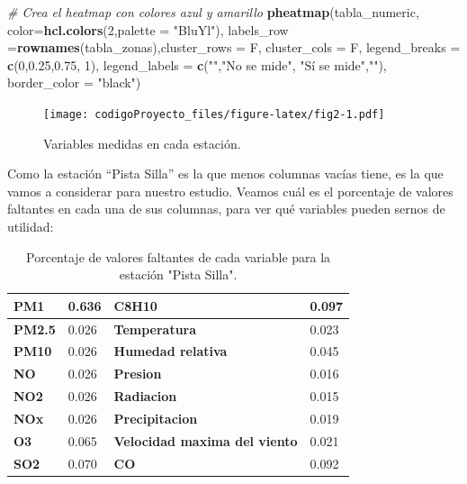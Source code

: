 \documentclass[
]{article}
\newenvironment{Shaded}{\begin{snugshade}}{\end{snugshade}}
\newcommand{\AttributeTok}[1]{\textcolor[rgb]{0.13,0.29,0.53}{#1}}
\newcommand{\CommentTok}[1]{\textcolor[rgb]{0.56,0.35,0.01}{\textit{#1}}}
\newcommand{\DecValTok}[1]{\textcolor[rgb]{0.00,0.00,0.81}{#1}}
\newcommand{\FloatTok}[1]{\textcolor[rgb]{0.00,0.00,0.81}{#1}}
\newcommand{\FunctionTok}[1]{\textcolor[rgb]{0.13,0.29,0.53}{\textbf{#1}}}
\newcommand{\NormalTok}[1]{#1}
\newcommand{\StringTok}[1]{\textcolor[rgb]{0.31,0.60,0.02}{#1}}
\begin{document}
\begin{Shaded}
\begin{Highlighting}[]
\CommentTok{\# Crea el heatmap con colores azul y amarillo}
\FunctionTok{pheatmap}\NormalTok{(tabla\_numeric, }\AttributeTok{color=}\FunctionTok{hcl.colors}\NormalTok{(}\DecValTok{2}\NormalTok{,}\AttributeTok{palette =} \StringTok{"BluYl"}\NormalTok{), }
         \AttributeTok{labels\_row =}\FunctionTok{rownames}\NormalTok{(tabla\_zonas),}\AttributeTok{cluster\_rows =}\NormalTok{ F, }
         \AttributeTok{cluster\_cols =}\NormalTok{ F, }\AttributeTok{legend\_breaks =} \FunctionTok{c}\NormalTok{(}\DecValTok{0}\NormalTok{,}\FloatTok{0.25}\NormalTok{,}\FloatTok{0.75}\NormalTok{, }\DecValTok{1}\NormalTok{), }
         \AttributeTok{legend\_labels =} \FunctionTok{c}\NormalTok{(}\StringTok{""}\NormalTok{,}\StringTok{"No se mide"}\NormalTok{, }\StringTok{"Sí se mide"}\NormalTok{,}\StringTok{""}\NormalTok{), }
         \AttributeTok{border\_color =} \StringTok{"black"}\NormalTok{)}
\end{Highlighting}
\end{Shaded}

\begin{figure}
\centering
\texttt{[image: codigoProyecto\_files/figure-latex/fig2-1.pdf]}
\caption{Variables medidas en cada estación.\label{fig:fig2}}
\end{figure}

Como la estación ``Pista Silla'' es la que menos columnas vacías tiene,
es la que vamos a considerar para nuestro estudio. Veamos cuál es el
porcentaje de valores faltantes en cada una de sus columnas, para ver
qué variables pueden sernos de utilidad:

\begin{table}[ht]
\centering
\begin{tabular}{|l|l|l|l|}
\hline
\textbf{PM1} & 0.636 & \textbf{C8H10} & 0.097 \\ \hline
\textbf{PM2.5} & 0.026 & \textbf{Temperatura} & 0.023 \\ \hline
\textbf{PM10} & 0.026 & \textbf{Humedad relativa} & 0.045 \\ \hline
\textbf{NO} & 0.026 & \textbf{Presion} & 0.016 \\ \hline
\textbf{NO2} & 0.026 & \textbf{Radiacion} & 0.015 \\ \hline
\textbf{NOx} & 0.026 & \textbf{Precipitacion} & 0.019 \\ \hline
\textbf{O3} & 0.065 & \textbf{Velocidad maxima del viento} & 0.021 \\ \hline
\textbf{SO2} & 0.070 & \textbf{CO} & 0.092  \\ \hline
\end{tabular}
\caption{Porcentaje de valores faltantes de cada variable para la estación "Pista Silla".}
\label{tabla2}
\end{table}
\end{document}
